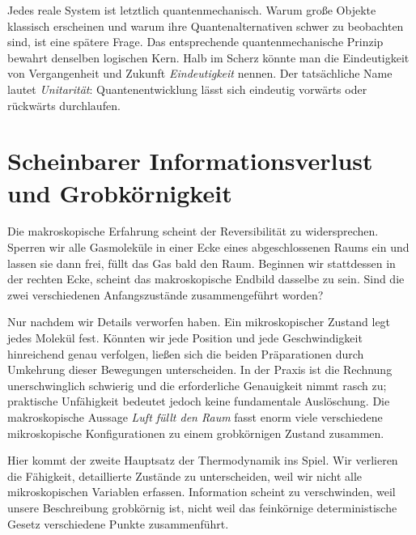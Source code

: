 Jedes reale System ist letztlich quantenmechanisch. Warum große Objekte klassisch erscheinen und warum ihre Quantenalternativen schwer zu beobachten sind, ist eine spätere Frage. Das entsprechende quantenmechanische Prinzip bewahrt denselben logischen Kern. Halb im Scherz könnte man die Eindeutigkeit von Vergangenheit und Zukunft \emph{Eindeutigkeit} nennen. Der tatsächliche Name lautet \emph{Unitarität}: Quantenentwicklung lässt sich eindeutig vorwärts oder rückwärts durchlaufen.

\section{Scheinbarer Informationsverlust und Grobkörnigkeit}

Die makroskopische Erfahrung scheint der Reversibilität zu widersprechen. Sperren wir alle Gasmoleküle in einer Ecke eines abgeschlossenen Raums ein und lassen sie dann frei, füllt das Gas bald den Raum. Beginnen wir stattdessen in der rechten Ecke, scheint das makroskopische Endbild dasselbe zu sein. Sind die zwei verschiedenen Anfangszustände zusammengeführt worden?

Nur nachdem wir Details verworfen haben. Ein mikroskopischer Zustand legt jedes Molekül fest. Könnten wir jede Position und jede Geschwindigkeit hinreichend genau verfolgen, ließen sich die beiden Präparationen durch Umkehrung dieser Bewegungen unterscheiden. In der Praxis ist die Rechnung unerschwinglich schwierig und die erforderliche Genauigkeit nimmt rasch zu; praktische Unfähigkeit bedeutet jedoch keine fundamentale Auslöschung. Die makroskopische Aussage \emph{Luft füllt den Raum} fasst enorm viele verschiedene mikroskopische Konfigurationen zu einem grobkörnigen Zustand zusammen.

Hier kommt der zweite Hauptsatz der Thermodynamik ins Spiel. Wir verlieren die Fähigkeit, detaillierte Zustände zu unterscheiden, weil wir nicht alle mikroskopischen Variablen erfassen. Information scheint zu verschwinden, weil unsere Beschreibung grobkörnig ist, nicht weil das feinkörnige deterministische Gesetz verschiedene Punkte zusammenführt.

\begin{classroomqa}
\end{classroomqa}

